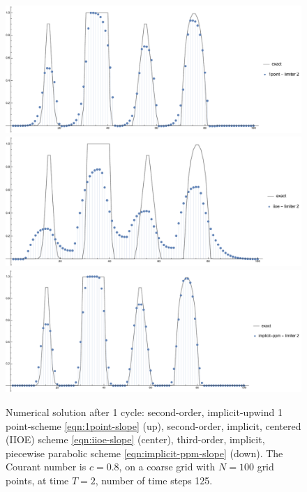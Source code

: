 \documentclass[../thesis.tex]{subfiles}
\begin{document}
\begin{figure}[H]
	\centering
	\includegraphics[width=\textwidth]{fig-1point-c0p8-T2-limit2-shu.pdf}
	\includegraphics[width=\textwidth]{fig-iioe-c0p8-T2-limit2-shu.pdf}
	\includegraphics[width=\textwidth]{fig-implicit-ppm-c0p8-T2-limit2-shu.pdf}
	\caption{Numerical solution after 1 cycle: second-order, implicit-upwind 1 point-scheme \eqref{eqn:1point-slope} (up), second-order, implicit, centered (IIOE) scheme \eqref{eqn:iioe-slope} (center), third-order, implicit, piecewise parabolic scheme \eqref{eqn:implicit-ppm-slope} (down). The Courant number is \(c = 0.8\), on a coarse grid with \(N = 100\) grid points, at time \(T = 2\), number of time steps 125.}
	\label{fig:c0p8-T2-limit2-shu}
\end{figure}
\end{document}
